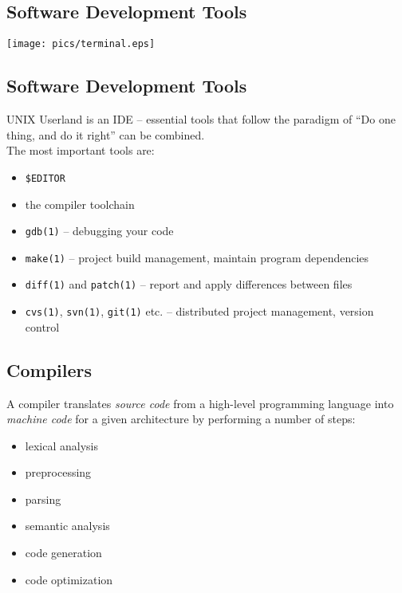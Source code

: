 \documentclass[xga]{xdvislides}
\begin{document}
\subsection{Software Development Tools}
\begin{center}
	\texttt{[image: pics/terminal.eps]}
\end{center}

\subsection{Software Development Tools}
UNIX Userland is an IDE -- essential tools that follow the paradigm of ``Do
one thing, and do it right'' can be combined. \\

The most important tools are:
\begin{itemize}
	\item \verb+$EDITOR+
	\item the compiler toolchain
	\item {\tt gdb(1)} -- debugging your code
	\item {\tt make(1)} -- project build management, maintain program
		dependencies
	\item {\tt diff(1)} and {\tt patch(1)} -- report and apply differences
		between files
	\item {\tt cvs(1)}, {\tt svn(1)}, {\tt git(1)} etc. -- distributed project management,
		 version control
\end{itemize}

%
%

\subsection{Compilers}

A compiler translates {\em source code} from a high-level programming
language into {\em machine code} for a given architecture by performing a
number of steps:

\begin{itemize}
	\item lexical analysis
	\item preprocessing
	\item parsing
	\item semantic analysis
	\item code generation
	\item code optimization
\end{itemize}
\end{document}
